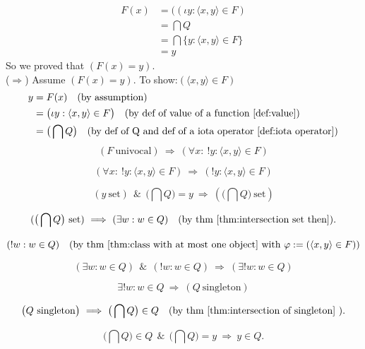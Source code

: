 \documentclass[10pt,a4paper]{article}
\theoremstyle{definition}
\newcommand{\AND}{\ \ \&\ \ }
\newcommand{\IMPLIES}{\ \Longrightarrow\ }
\newcommand{\intersection}{\bigcap}
\newcommand{\set}{\mathrm{\ set}}
\newcommand{\singleton}{\mathrm{\ singleton}}
\newcommand{\univocal}{\mathrm{\ univocal}}
\begin{document}
\begin{align*}
F(x)&=\big((\iota y: \langle x,y\rangle\in F)\\
&=\intersection Q\\
&=\intersection \{y: \langle x,y\rangle\in F\}\\
&=y
\end{align*}
So we proved that $(F(x)=y)$.\\
\noindent($\Rightarrow$) Assume $(F(x)=y)$. To show:$(\langle x,y\rangle\in F)$
\begin{align*}
y&=F(x)
\quad(\mbox{by assumption}) \\
&=\big(\iota y: \langle x,y\rangle\in F\big)
\quad(\mbox{by def of value of a function \ref{def:value}})
\\
&=\big(\intersection Q\big)
\quad(\mbox{by def of Q and def of a iota operator \ref{def:iota operator}})
\end{align*}
\[
(F\univocal)
\IMPLIES
(\forall x:\ !y : \langle x,y\rangle \in F)
\]

\[
(\forall x:\ !y : \langle x,y\rangle \in F)
\IMPLIES
(!y : \langle x,y\rangle \in F)
\]

\[
(y\set)
\AND
\big(\intersection Q\big)=y
\IMPLIES
(\big(\intersection Q\big)\set)
\]

\[
(\big(\intersection Q\big)\set)
\IMPLIES
(\exists w: w\in Q)
\quad(\mbox{by thm \ref{thm:intersection set then}}).
\]


\[
(!w:w\in Q)
\quad\mbox{(by thm \ref{thm:class with at most one object} with $\varphi:=(\langle x,y\rangle\in F)$)}
\]

\[
(\exists w: w\in Q)
\AND
(! w: w\in Q)
\IMPLIES
(\exists! w: w\in Q)
\]

\[
\exists! w: w\in Q
\IMPLIES
(Q\singleton)
\]

\[
\big(Q\singleton\big)
\IMPLIES
\big(\intersection Q\big)\in Q
\quad(\mbox{by thm \ref{thm:intersection of singleton} }).
\]

\[
\big(\intersection Q\big)\in Q
\AND
\big(\intersection Q\big)=y
\IMPLIES
y\in Q.
\]
\end{document}
